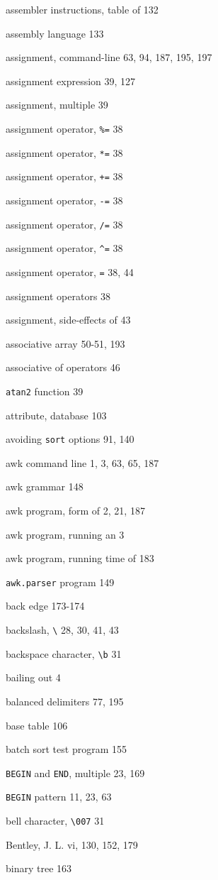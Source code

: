 \begin{multicols}{2}
assembler instructions, table of 132

assembly language 133

assignment, command-line 63, 94, 187, 195, 197

assignment expression 39, 127

assignment, multiple 39

assignment operator, \verb'%=' 38

assignment operator, \verb'*=' 38

assignment operator, \verb'+=' 38

assignment operator, \verb'-=' 38

assignment operator, \verb'/=' 38

assignment operator, \verb'^=' 38

assignment operator, \verb'=' 38, 44

assignment operators 38 

assignment, side-effects of 43

associative array 50-51, 193

associative of operators 46

\verb'atan2' function 39

attribute, database 103

avoiding \verb'sort' options 91, 140

awk command line 1, 3, 63, 65, 187

awk grammar 148

awk program, form of 2, 21, 187

awk program, running an 3

awk program, running time of 183

\verb'awk.parser' program 149

back edge 173-174

backslash, \verb'\' 28, 30, 41, 43

backspace character, \verb'\b' 31

bailing out 4

balanced delimiters 77, 195

base table 106

batch sort test program 155

\verb'BEGIN' and \verb'END', multiple 23, 169

\verb'BEGIN' pattern 11, 23, 63

bell character, \verb'\007' 31

Bentley, J. L. vi, 130, 152, 179

binary tree 163


\end{multicols}
